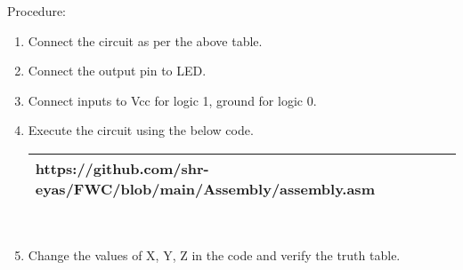 \documentclass[journal,12pt]{IEEEtran}
\begin{document}
\begin{flushleft}

Procedure:\\
\begin{enumerate}[label=\alph*.,labelindent=\parindent,leftmargin=*]
    \item Connect the circuit as per the above table.
    \vspace{2pt}
    \item Connect the output pin to LED.
    \vspace{2pt}
    \item Connect inputs to Vcc for logic 1, ground for logic 0.
    \vspace{2pt}
    \item Execute the circuit using the below code.
    \\
    \vspace{7pt}
    \begin{tabularx}{0.56\textwidth} { 
    | >{\centering\arraybackslash}X |}
    \hline
    https://github.com/shr-eyas/FWC/blob/main/Assembly/assembly.asm\\
    \hline
    \end{tabularx}
    \\
    \vspace{10pt}
    \item Change the values of X, Y, Z in the code and verify the truth table.\\
    
\end{enumerate}
\end{flushleft}


\end{document}
